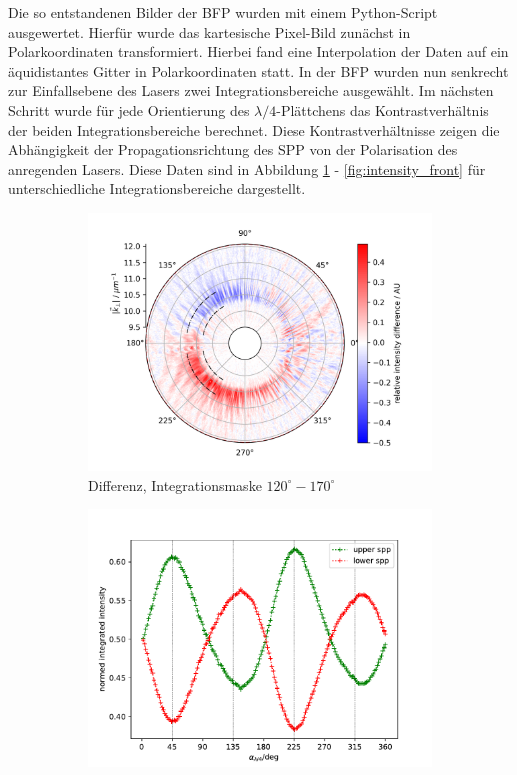 \documentclass[titlepage]{article}
\begin{document}
	Die so entstandenen Bilder der BFP wurden mit einem Python-Script ausgewertet. Hierfür wurde das kartesische Pixel-Bild zunächst in Polarkoordinaten transformiert. Hierbei fand eine Interpolation der Daten auf ein äquidistantes Gitter in Polarkoordinaten statt. In der BFP wurden nun senkrecht zur Einfallsebene des Lasers zwei Integrationsbereiche ausgewählt. Im nächsten Schritt wurde für jede Orientierung des $\lambda/4$-Plättchens das Kontrastverhältnis der beiden Integrationsbereiche berechnet. Diese Kontrastverhältnisse zeigen die Abhängigkeit der Propagationsrichtung des SPP von der Polarisation des anregenden Lasers. Diese Daten sind in Abbildung \ref{fig:diff_back} - \ref{fig:intensity_front} für unterschiedliche Integrationsbereiche dargestellt.
	\begin{figure}
		\label{fig:spin_hall_measure}
		\centering
		\begin{subfigure}[b]{0.5\textwidth}
			\centering
			\includegraphics[width=\textwidth]{figures/spin_hall/diff_back.png}
			\caption{Differenz, Integrationsmaske $120^\circ-170^\circ$}
			\label{fig:diff_back}
		\end{subfigure}
		\hfill
		\begin{subfigure}[b]{0.49\textwidth}
			\centering
			\includegraphics[width=\textwidth]{figures/spin_hall/intensity_back.pdf}

\end{subfigure}
\end{figure}
\end{document}
